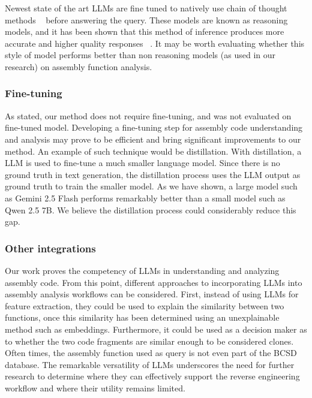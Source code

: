Newest state of the art LLMs are fine tuned to natively use chain of thought methods ~\cite{c-o-t} before answering the query.
These models are known as reasoning models, and it has been shown that this method of inference produces more accurate and
higher quality responses ~\cite{c-o-t,reasoning,thinking-llm}. It may be worth evaluating whether this style of model performs better than
non reasoning models (as used in our research) on assembly function analysis.

\subsubsection{Fine-tuning}

As stated, our method does not require fine-tuning, and was not evaluated on fine-tuned model. Developing a fine-tuning step
for assembly code understanding and analysis may prove to be efficient and bring significant improvements to our method.
An example of such technique would be distillation. With distillation, a LLM is used to fine-tune a much smaller language
model. Since there is no ground truth in text generation, the distillation process uses the LLM output as ground truth
to train the smaller model. As we have shown, a large model such as Gemini 2.5 Flash performs remarkably better than a
small model such as Qwen 2.5 7B. We believe the distillation process could considerably reduce this gap.

\subsubsection{Other integrations}

Our work proves the competency of LLMs in understanding and analyzing assembly code. From this point, different approaches
to incorporating LLMs into assembly analysis workflows can be considered. First, instead of using LLMs for feature extraction,
they could be used to explain the similarity between two functions, once this similarity has been determined using an unexplainable
method such as embeddings. Furthermore, it could be used as a decision maker as to whether the two code fragments are similar enough
to be considered clones. Often times, the assembly function used as query is not even part of the BCSD database. The remarkable versatility
of LLMs underscores the need for further research to determine where they can effectively support the reverse engineering workflow and where
their utility remains limited.

